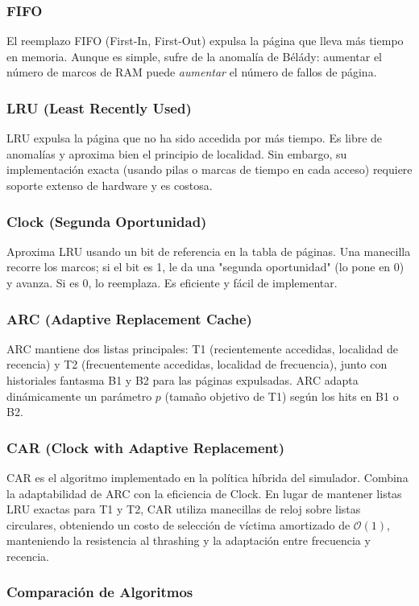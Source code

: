 \documentclass[12pt,letterpaper]{article}
\begin{document}
\subsubsection{FIFO}
El reemplazo FIFO (First-In, First-Out) expulsa la página que lleva más tiempo en memoria. Aunque es simple, sufre de la anomalía de Bélády: aumentar el número de marcos de RAM puede \textit{aumentar} el número de fallos de página. \subsubsection{LRU (Least Recently Used)}
LRU expulsa la página que no ha sido accedida por más tiempo. Es libre de anomalías y aproxima bien el principio de localidad. Sin embargo, su implementación exacta (usando pilas o marcas de tiempo en cada acceso) requiere soporte extenso de hardware y es costosa. \subsubsection{Clock (Segunda Oportunidad)}
Aproxima LRU usando un bit de referencia en la tabla de páginas. Una manecilla recorre los marcos; si el bit es 1, le da una "segunda oportunidad" (lo pone en 0) y avanza. Si es 0, lo reemplaza. Es eficiente y fácil de implementar. \subsubsection{ARC (Adaptive Replacement Cache)}
ARC mantiene dos listas principales: T1 (recientemente accedidas, localidad de recencia) y T2 (frecuentemente accedidas, localidad de frecuencia), junto con historiales fantasma B1 y B2 para las páginas expulsadas. ARC adapta dinámicamente un parámetro $p$ (tamaño objetivo de T1) según los hits en B1 o B2. \subsubsection{CAR (Clock with Adaptive Replacement)}
CAR es el algoritmo implementado en la política híbrida del simulador. Combina la adaptabilidad de ARC con la eficiencia de Clock. En lugar de mantener listas LRU exactas para T1 y T2, CAR utiliza manecillas de reloj sobre listas circulares, obteniendo un costo de selección de víctima amortizado de $\mathcal{O}(1)$, manteniendo la resistencia al thrashing y la adaptación entre frecuencia y recencia. \subsubsection{Comparación de Algoritmos}
\end{document}
